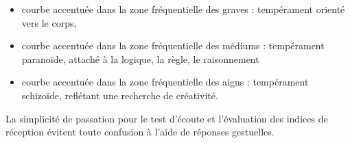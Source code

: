 \begin{itemize}
	\item courbe accentuée dans la zone fréquentielle des graves : tempérament
	orienté vers le corps,
	
	\item courbe accentuée dans la zone fréquentielle des médiums : tempérament
	paranoïde, attaché à la logique, la règle, le raisonnement 
	
	\item courbe accentuée dans la zone fréquentielle des aigus : tempérament
	schizoïde, reflétant une recherche de créativité. 
\end{itemize}


La simplicité de
passation pour le test d'écoute et 
 l'évaluation des indices de réception évitent toute confusion
à l'aide de réponses gestuelles.



 






